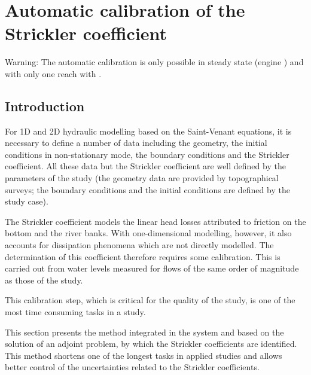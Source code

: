 \chapter{Automatic calibration of the Strickler coefficient}
\label{Chapter5}

\begin{WarningBlock}{Warning:}
The automatic calibration is only possible in steady state (engine \SARAP{}) and with only one reach with \mascaret{}.
\end{WarningBlock}

\section{Introduction}

For 1D and 2D hydraulic modelling based on the Saint-Venant equations, it is necessary to define a number of data including the geometry, the initial conditions in non-stationary mode, the boundary conditions and the Strickler coefficient. All these data but the Strickler coefficient are well defined by the parameters of the study (the geometry data are provided by topographical surveys; the boundary conditions and the initial conditions are defined by the study case).

The Strickler coefficient models the linear head losses attributed to friction on the bottom and the river banks. With one-dimensional modelling, however, it also accounts for dissipation phenomena which are not directly modelled. The determination of this coefficient therefore requires some calibration. This is carried out from water levels measured for flows of the same order of magnitude as those of the study.

This calibration step, which is critical for the quality of the study, is one of the most time consuming tasks in a study.

This section presents the method integrated in the \mascaret{} system and based on the solution of an adjoint problem, by which the Strickler coefficients are identified. This method shortens one of the longest tasks in applied studies and allows better control of the uncertainties related to the Strickler coefficients.

